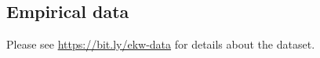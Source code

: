 \subsection{Empirical data}\label{Empirical data}
Please see \url{https://bit.ly/ekw-data} for details about the dataset.
